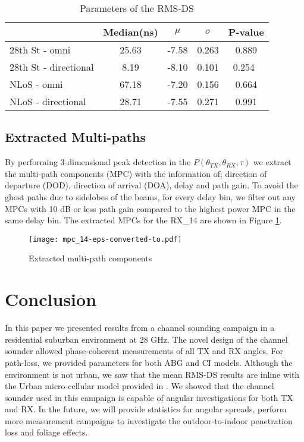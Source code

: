 \documentclass[conference]{IEEEtran}
\begin{document}
 \begin{table}[tbp]\centering \caption{Parameters of the RMS-DS} \label{tab:rms}
   \begin{tabular}{|l|c|c|c|c|}\hline
       & Median(ns) & $\mu$ & $\sigma$  & P-value  \\ \hline
     28th St - omni & 25.63 & -7.58 & 0.263 & 0.889\\
     28th St - directional & 8.19 & -8.10 & 0.101 & 0.254\ \\
     NLoS - omni & 67.18 & -7.20 & 0.156 & 0.664\\
     NLoS - directional & 28.71 & -7.55 & 0.271 & 0.991\\  \hline
   \end{tabular}
 \end{table}


\subsection{Extracted Multi-paths}
By performing 3-dimensional peak detection in the $P(\theta_{TX},\theta_{RX},\tau)$ we extract the multi-path components (MPC) with the information of; direction of departure (DOD), direction of arrival (DOA), delay and path gain. To avoid the ghost paths due to sidelobes of the beams, for every delay bin, we filter out any MPCs with 10 dB or less path gain compared to the highest power MPC in the same delay bin. The extracted MPCs for the RX\_14 are shown in Figure \ref{Fig:mpc}. 


\begin{figure}[tbp]\centering
  \texttt{[image: mpc\_14-eps-converted-to.pdf]}\caption{Extracted multi-path components}\label{Fig:mpc}
\end{figure}

\section{Conclusion} \label{sec:conc}

In this paper we presented results from a channel sounding campaign in a residential suburban environment at 28 GHz. The novel design of the channel sounder allowed phase-coherent measurements of all TX and RX angles. For path-loss, we provided parameters for both ABG and CI models. Although the environment is not urban, we saw that the mean RMS-DS results are inline with the Urban micro-cellular model provided in \cite{3GPP_5G_2016}. We showed that the channel sounder used in this campaign is capable of angular investigations for both TX and RX. In the future, we will provide statistics for angular spreads, perform more measurement campaigns to investigate the outdoor-to-indoor penetration loss and foliage effects.
\end{document}
